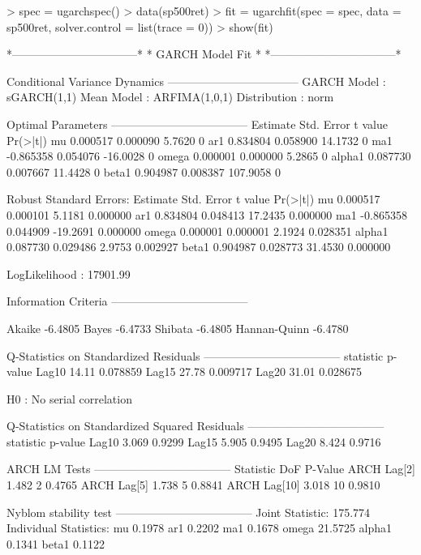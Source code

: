 \begin{Schunk}
\begin{Sinput}
> spec = ugarchspec()
> data(sp500ret)
> fit = ugarchfit(spec = spec, data = sp500ret, solver.control = list(trace = 0))
> show(fit)
\end{Sinput}
\begin{Soutput}
*---------------------------------*
*          GARCH Model Fit        *
*---------------------------------*

Conditional Variance Dynamics
-----------------------------------
GARCH Model     : sGARCH(1,1)
Mean Model      : ARFIMA(1,0,1)
Distribution    : norm

Optimal Parameters
------------------------------------
        Estimate  Std. Error  t value Pr(>|t|)
mu      0.000517    0.000090   5.7620        0
ar1     0.834804    0.058900  14.1732        0
ma1    -0.865358    0.054076 -16.0028        0
omega   0.000001    0.000000   5.2865        0
alpha1  0.087730    0.007667  11.4428        0
beta1   0.904987    0.008387 107.9058        0

Robust Standard Errors:
        Estimate  Std. Error  t value Pr(>|t|)
mu      0.000517    0.000101   5.1181 0.000000
ar1     0.834804    0.048413  17.2435 0.000000
ma1    -0.865358    0.044909 -19.2691 0.000000
omega   0.000001    0.000001   2.1924 0.028351
alpha1  0.087730    0.029486   2.9753 0.002927
beta1   0.904987    0.028773  31.4530 0.000000

LogLikelihood : 17901.99

Information Criteria
------------------------------------

Akaike       -6.4805
Bayes        -6.4733
Shibata      -6.4805
Hannan-Quinn -6.4780

Q-Statistics on Standardized Residuals
------------------------------------
      statistic  p-value
Lag10     14.11 0.078859
Lag15     27.78 0.009717
Lag20     31.01 0.028675

H0 : No serial correlation

Q-Statistics on Standardized Squared Residuals
------------------------------------
      statistic p-value
Lag10     3.069  0.9299
Lag15     5.905  0.9495
Lag20     8.424  0.9716

ARCH LM Tests
------------------------------------
             Statistic DoF P-Value
ARCH Lag[2]      1.482   2  0.4765
ARCH Lag[5]      1.738   5  0.8841
ARCH Lag[10]     3.018  10  0.9810

Nyblom stability test
------------------------------------
Joint Statistic:  175.774
Individual Statistics:
mu      0.1978
ar1     0.2202
ma1     0.1678
omega  21.5725
alpha1  0.1341
beta1   0.1122


\end{Soutput}
\end{Schunk}
